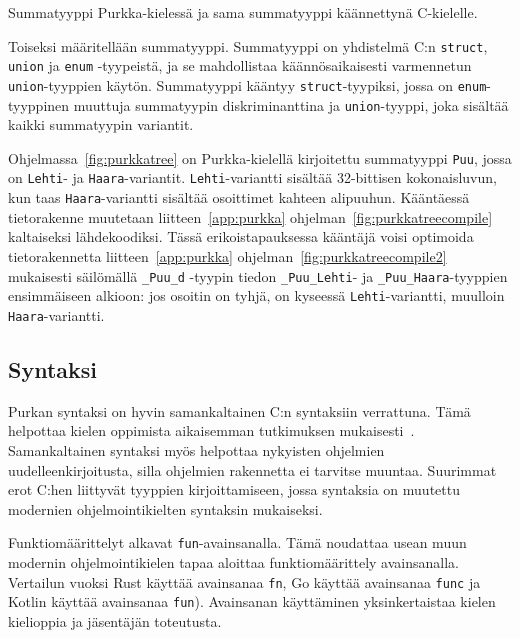 \begin{listing}[ht!]
    \inputminted{Rust}{koodi/sumtype.prk}
    \caption{Summatyyppi Purkka-kielessä ja sama summatyyppi käännettynä C-kielelle.}
    \label{fig:purkkatree}
\end{listing}

Toiseksi määritellään summatyyppi. Summatyyppi on yhdistelmä C:n
\texttt{struct}, \texttt{union} ja \texttt{enum} -tyypeistä, ja se mahdollistaa
käännösaikaisesti varmennetun \texttt{union}-tyyppien käytön. Summatyyppi kääntyy
\texttt{struct}-tyypiksi, jossa on \texttt{enum}-tyyppinen muuttuja summatyypin
diskriminanttina ja \texttt{union}-tyyppi, joka sisältää kaikki summatyypin
variantit.

Ohjelmassa~\ref{fig:purkkatree} on Purkka-kielellä kirjoitettu summatyyppi
\texttt{Puu}, jossa on \texttt{Lehti}- ja \texttt{Haara}-variantit.
\texttt{Lehti}-variantti sisältää 32-bittisen kokonaisluvun, kun taas
\texttt{Haara}-variantti sisältää osoittimet kahteen alipuuhun. Kääntäessä
tietorakenne muutetaan liitteen~\ref{app:purkka}
ohjelman~\ref{fig:purkkatreecompile} kaltaiseksi lähdekoodiksi. Tässä
erikoistapauksessa kääntäjä voisi optimoida tietorakennetta
liitteen~\ref{app:purkka} ohjelman~\ref{fig:purkkatreecompile2} mukaisesti
säilömällä \texttt{\_Puu\_d} -tyypin tiedon \texttt{\_Puu\_Lehti}- ja
\texttt{\_Puu\_Haara}-tyyppien ensimmäiseen alkioon: jos osoitin on tyhjä, on
kyseessä \texttt{Lehti}-variantti, muulloin \texttt{Haara}-variantti.

\subsection{Syntaksi}

Purkan syntaksi on hyvin samankaltainen C:n syntaksiin verrattuna. Tämä
helpottaa kielen oppimista aikaisemman tutkimuksen
mukaisesti~\citep{languagelearning}. Samankaltainen syntaksi myös helpottaa
nykyisten ohjelmien uudelleenkirjoitusta, silla ohjelmien rakennetta ei
tarvitse muuntaa. Suurimmat erot C:hen liittyvät tyyppien kirjoittamiseen,
jossa syntaksia on muutettu modernien ohjelmointikielten syntaksin mukaiseksi.

Funktiomäärittelyt alkavat \texttt{fun}-avainsanalla. Tämä noudattaa usean muun
modernin ohjelmointikielen tapaa aloittaa funktiomäärittely avainsanalla.
Vertailun vuoksi Rust käyttää avainsanaa \texttt{fn}, Go käyttää avainsanaa
\texttt{func} ja Kotlin käyttää avainsanaa \texttt{fun}). Avainsanan
käyttäminen yksinkertaistaa kielen kielioppia ja jäsentäjän toteutusta.

